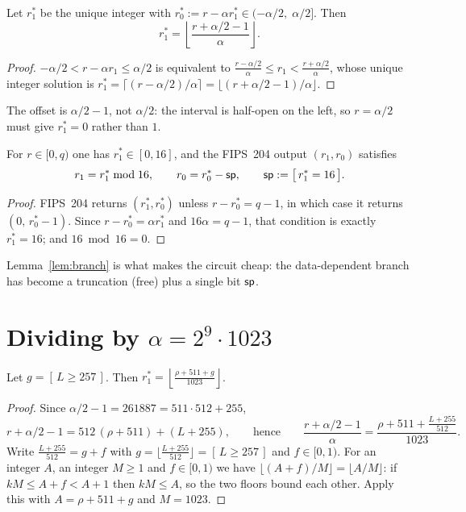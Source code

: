 \begin{lemma}\label{lem:floor}
Let $r_1^{*}$ be the unique integer with
$r_0^{*}:=r-\alpha r_1^{*}\in(-\alpha/2,\;\alpha/2]$. Then
\[
  r_1^{*}=\left\lfloor\frac{r+\alpha/2-1}{\alpha}\right\rfloor .
\]
\end{lemma}

\begin{proof}
$-\alpha/2<r-\alpha r_1\le\alpha/2$ is equivalent to
$\frac{r-\alpha/2}{\alpha}\le r_1<\frac{r+\alpha/2}{\alpha}$, whose unique
integer solution is
$r_1^{*}=\big\lceil (r-\alpha/2)/\alpha\big\rceil
       =\big\lfloor (r+\alpha/2-1)/\alpha\big\rfloor$.
\end{proof}

The offset is $\alpha/2-1$, not $\alpha/2$: the interval is half-open on the
left, so $r=\alpha/2$ must give $r_1^{*}=0$ rather than $1$.

\begin{lemma}\label{lem:branch}
For $r\in[0,q)$ one has $r_1^{*}\in[0,16]$, and the FIPS~204 output
$(r_1,r_0)$ satisfies
\[
  r_1=r_1^{*}\bmod 16,\qquad
  r_0=r_0^{*}-\mathsf{sp},\qquad
  \mathsf{sp}:=\big[\,r_1^{*}=16\,\big].
\]
\end{lemma}

\begin{proof}
FIPS~204 returns $(r_1^{*},r_0^{*})$ unless $r-r_0^{*}=q-1$, in which case it
returns $(0,\,r_0^{*}-1)$. Since $r-r_0^{*}=\alpha r_1^{*}$ and
$16\alpha=q-1$, that condition is exactly $r_1^{*}=16$; and
$16\bmod 16=0$.
\end{proof}

Lemma~\ref{lem:branch} is what makes the circuit cheap: the data-dependent
branch has become a truncation (free) plus a single bit $\mathsf{sp}$.

\section{Dividing by $\alpha=2^{9}\cdot 1023$}

\begin{lemma}\label{lem:split}
Let $g=[\,L\ge 257\,]$. Then
$\displaystyle r_1^{*}=\left\lfloor\frac{\rho+511+g}{1023}\right\rfloor$.
\end{lemma}

\begin{proof}
Since $\alpha/2-1=261887=511\cdot 512+255$,
\[
  r+\alpha/2-1=512\,(\rho+511)+(L+255),
  \qquad\text{hence}\qquad
  \frac{r+\alpha/2-1}{\alpha}=\frac{\rho+511+\frac{L+255}{512}}{1023}.
\]
Write $\frac{L+255}{512}=g+f$ with
$g=\big\lfloor\frac{L+255}{512}\big\rfloor=[\,L\ge257\,]$ and $f\in[0,1)$.
For an integer $A$, an integer $M\ge1$ and $f\in[0,1)$ we have
$\lfloor (A+f)/M\rfloor=\lfloor A/M\rfloor$: if $kM\le A+f<A+1$ then $kM\le A$,
so the two floors bound each other. Apply this with $A=\rho+511+g$ and
$M=1023$.
\end{proof}

